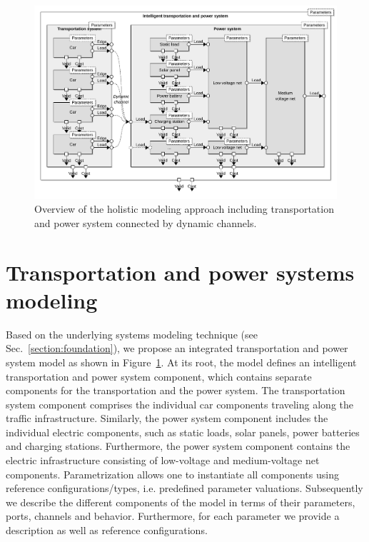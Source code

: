 \begin{figure}[b]
	\centering
	\includegraphics[width=\textwidth]{../gfx/model.pdf}
	\caption{Overview of the holistic modeling approach including transportation and power system connected by dynamic channels.}
	\label{fig:model}
\end{figure}

\section{Transportation and power systems modeling}
\label{section:contribution}

Based on the underlying systems modeling technique (see Sec.~\ref{section:foundation}), we propose an integrated transportation and power system model as shown in Figure~\ref{fig:model}. At its root, the model defines an intelligent transportation and power system component, which contains separate components for the transportation and the power system. The transportation system component comprises the individual car components traveling along the traffic infrastructure. Similarly, the power system component includes the individual electric components, such as static loads, solar panels, power batteries and charging stations. Furthermore, the power system component contains the electric infrastructure consisting of low-voltage and medium-voltage net components. Parametrization allows one to instantiate all components using reference configurations/types, i.e. predefined parameter valuations. Subsequently we describe the different components of the model in terms of their parameters, ports, channels and behavior. Furthermore, for each parameter we provide a description as well as reference configurations.

